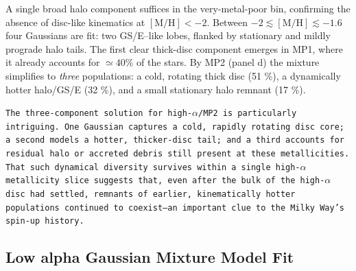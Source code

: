 \documentclass[a4paper,12pt]{article}
\begin{document}
A single broad halo component suffices in the very-metal-poor bin, confirming the absence of disc-like kinematics at $[\mathrm{M/H}]<-2$.  
Between $-2\lesssim\mathrm{[M/H]}\lesssim-1.6$ four Gaussians are fit: two GS/E–like lobes, flanked by stationary and mildly prograde halo tails.  
The first clear thick-disc component emerges in MP1, where it already accounts for $\simeq40\%$ of the stars.  
By MP2 (panel d) the mixture simplifies to \emph{three} populations: a cold, rotating thick disc (51 \%), a dynamically hotter halo/GS/E (32 \%), and a small stationary halo remnant (17 \%).  


\texttt{The three-component solution for high-$\alpha$/MP2 is particularly intriguing.  
One Gaussian captures a cold, rapidly rotating disc core; a second models a hotter, thicker-disc tail; and a third accounts for residual halo or accreted debris still present at these metallicities.  
That such dynamical diversity survives within a single high-$\alpha$ metallicity slice suggests that, even after the bulk of the high-$\alpha$ disc had settled, remnants of earlier, kinematically hotter populations continued to coexist—an important clue to the Milky Way’s spin-up history.
}

\subsection{Low alpha Gaussian Mixture Model Fit}
\end{document}
